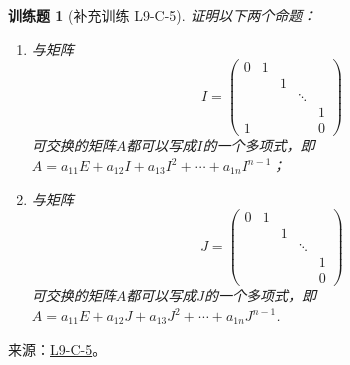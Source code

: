 \documentclass[UTF8,12pt,a4paper,fontset=fandol]{ctexart}
\newtheorem{exercise}{训练题}[section]
\begin{document}
\begin{exercise}[补充训练 L9-C-5]\label{prob:L9-C-5}
证明以下两个命题：
        \begin{enumerate}
            \item 与矩阵
\[I=\begin{pmatrix}
                          0 & 1 &   &        &   \\
                            &   & 1 &        &   \\
                            &   &   & \ddots &   \\
                            &   &   &        & 1 \\
                          1 &   &   &        & 0
                      \end{pmatrix}\]
可交换的矩阵$A$都可以写成$I$的一个多项式，即$A=a_{11}E+a_{12}I+a_{13}I^2+\cdots+a_{1n}I^{n-1}$；

            \item 与矩阵
\[J=\begin{pmatrix}
                          0 & 1 &   &        &   \\
                            &   & 1 &        &   \\
                            &   &   & \ddots &   \\
                            &   &   &        & 1 \\
                            &   &   &        & 0
                      \end{pmatrix}\]
可交换的矩阵$A$都可以写成$J$的一个多项式，即$A=a_{11}E+a_{12}J+a_{13}J^2+\cdots+a_{1n}J^{n-1}$.
        \end{enumerate}
\end{exercise}
\noindent 来源：\href{https://github.com/yhwu-is/Linear-Algebra-Left-Undone/blob/new/%E8%AE%B2%E4%B9%89/%E4%B8%93%E9%A2%98/9%20%E7%9F%A9%E9%98%B5%E8%BF%90%E7%AE%97%E8%BF%9B%E9%98%B6.tex}{L9-C-5}。
\end{document}
